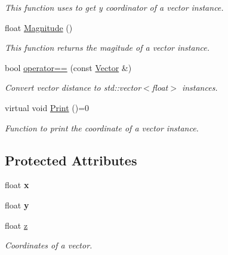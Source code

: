 \begin{DoxyCompactItemize}
\begin{DoxyCompactList}\small\item\em This function uses to get y coordinator of a vector instance. \end{DoxyCompactList}\item 
\mbox{\label{classcsci3081_1_1Vector_af9e09e9b9ce246fe42907c78533d3dc4}} 
float \hyperlink{classcsci3081_1_1Vector_af9e09e9b9ce246fe42907c78533d3dc4}{Magnitude} ()
\begin{DoxyCompactList}\small\item\em This function returns the magitude of a vector instance. \end{DoxyCompactList}\item 
bool \hyperlink{classcsci3081_1_1Vector_a0ce4762325d81521ba1e1a1f6ee1a171}{operator==} (const \hyperlink{classcsci3081_1_1Vector}{Vector} \&)
\begin{DoxyCompactList}\small\item\em Convert vector distance to std\+::vector$<$float$>$ instances. \end{DoxyCompactList}\item 
\mbox{\label{classcsci3081_1_1Vector_a8f0661975d9635c803551cd778f75ed4}} 
virtual void \hyperlink{classcsci3081_1_1Vector_a8f0661975d9635c803551cd778f75ed4}{Print} ()=0
\begin{DoxyCompactList}\small\item\em Function to print the coordinate of a vector instance. \end{DoxyCompactList}\end{DoxyCompactItemize}
\subsection*{Protected Attributes}
\begin{DoxyCompactItemize}
\item 
\mbox{\label{classcsci3081_1_1Vector_aad8fb83cdb7c74bec16148252a30ef85}} 
float {\bfseries x}
\item 
\mbox{\label{classcsci3081_1_1Vector_a4636a264c229f016fcca5b066d6b2329}} 
float {\bfseries y}
\item 
\mbox{\label{classcsci3081_1_1Vector_a11acb4af7109f0f16cec3eb95c881128}} 
float \hyperlink{classcsci3081_1_1Vector_a11acb4af7109f0f16cec3eb95c881128}{z}
\begin{DoxyCompactList}\small\item\em Coordinates of a vector. \end{DoxyCompactList}\end{DoxyCompactItemize}
